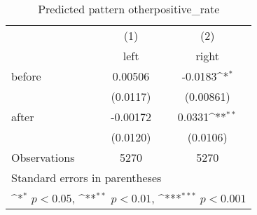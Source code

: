 \begin{table}[htbp]\centering
\def\sym#1{\ifmmode^{#1}\else\(^{#1}\)\fi}
\caption{Predicted pattern otherpositive\_rate}
\begin{tabular}{l*{2}{c}}
\hline\hline
                    &\multicolumn{1}{c}{(1)}&\multicolumn{1}{c}{(2)}\\
                    &\multicolumn{1}{c}{left}&\multicolumn{1}{c}{right}\\
\hline
before              &     0.00506         &     -0.0183\sym{*}  \\
                    &    (0.0117)         &   (0.00861)         \\
[1em]
after               &    -0.00172         &      0.0331\sym{**} \\
                    &    (0.0120)         &    (0.0106)         \\
\hline
Observations        &        5270         &        5270         \\
\hline\hline
\multicolumn{3}{l}{\footnotesize Standard errors in parentheses}\\
\multicolumn{3}{l}{\footnotesize \sym{*} \(p<0.05\), \sym{**} \(p<0.01\), \sym{***} \(p<0.001\)}\\
\end{tabular}
\end{table}
